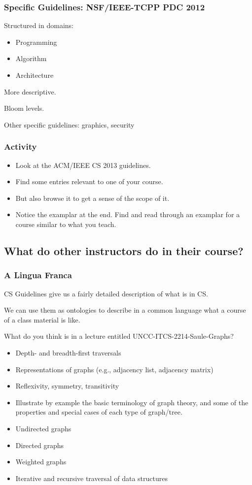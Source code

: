 \documentclass[aspectratio=169]{beamer}
\begin{document}
\begin{frame}
  \frametitle{Specific Guidelines: NSF/IEEE-TCPP PDC 2012}

  Structured in domains:
  \begin{itemize}
  \item Programming
  \item Algorithm
  \item Architecture
  \end{itemize}

  More descriptive.

  Bloom levels.

  Other specific guidelines: graphics, security  
\end{frame}


\begin{frame}
  \frametitle{Activity}

  \begin{itemize}
  \item Look at the ACM/IEEE CS 2013 guidelines.
  \item Find some entries relevant to one of your course.
  \item But also browse it to get a sense of the scope of it.
  \item Notice the examplar at the end. Find and read through an examplar for
    a course similar to what you teach.
  \end{itemize}
\end{frame}

\subsection{What do other instructors do in their course?}

\begin{frame}
  \frametitle{A Lingua Franca}

  CS Guidelines give us a fairly detailed description of what is in CS.

  We can use them as ontologies to describe in a common language what
  a course of a class material is like.

  \begin{block}{What do you think is in a lecture entitled UNCC-ITCS-2214-Saule-Graphs?}
    \tiny
  \begin{itemize} 
    \item Depth- and breadth-first traversals
    \item Representations of graphs (e.g., adjacency list, adjacency matrix)
    \item Reflexivity, symmetry, transitivity
    \item Illustrate by example the basic terminology of graph theory, and some of the properties and special cases of each type of graph/tree.
    \item Undirected graphs
    \item Directed graphs
    \item Weighted graphs
    \item Iterative and recursive traversal of data structures
  \end{itemize}
  \end{block}
\end{frame}
\end{document}

